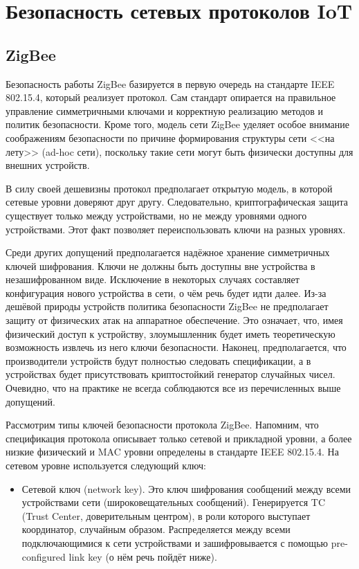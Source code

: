 \chapter{Безопасность сетевых протоколов IoT}

	\section{ZigBee}
	Безопасность работы ZigBee базируется в первую очередь на стандарте IEEE 802.15.4, который реализует
	протокол. Сам стандарт опирается на правильное управление симметричными ключами и корректную 
	реализацию методов и политик безопасности. Кроме того, модель сети ZigBee уделяет особое внимание 
	соображениям безопасности по причине формирования структуры сети <<на лету>> (ad-hoc сети), 
	поскольку такие сети могут быть физически доступны для внешних устройств.
	
	В силу своей дешевизны протокол предполагает открытую модель, в которой сетевые
	уровни доверяют друг другу. Следовательно, криптографическая защита существует только между
	устройствами, но не между уровнями одного устройствами. Этот факт позволяет переиспользовать
	ключи на разных уровнях.
	
	Среди других допущений предполагается надёжное хранение симметричных ключей шифрования.
	Ключи не должны быть доступны вне устройства в незашифрованном виде. Исключение в некоторых 
	случаях составляет конфигурация нового устройства в сети, о чём речь будет идти далее. Из-за
	дешёвой природы устройств политика безопасности ZigBee не предполагает защиту от физических
	атак на аппаратное обеспечение. Это означает, что, имея физический доступ к устройству, 
	злоумышленник будет иметь теоретическую возможность извлечь из него ключи безопасности.
	Наконец, предполагается, что производители устройств будут полностью следовать спецификации,
	а в устройствах будет присутствовать криптостойкий генератор случайных чисел. Очевидно, что
	на практике не всегда соблюдаются все из перечисленных выше допущений.
	
	Рассмотрим типы ключей безопасности протокола ZigBee. Напомним, что спецификация протокола
	описывает только сетевой и прикладной уровни, а более низкие физический и MAC уровни определены
	в стандарте IEEE 802.15.4. На сетевом уровне используется следующий ключ:
	
	\begin{itemize}
		\item Сетевой ключ (network key). Это ключ шифрования сообщений между всеми устройствами сети 
		(широковещательных сообщений). Генерируется TC (Trust Center, доверительным центром), в роли 
		которого выступает координатор, случайным образом. Распределяется между всеми подключающимися 
		к сети устройствами и зашифровывается с помощью pre-configured link key (о нём речь пойдёт ниже).
	\end{itemize}

